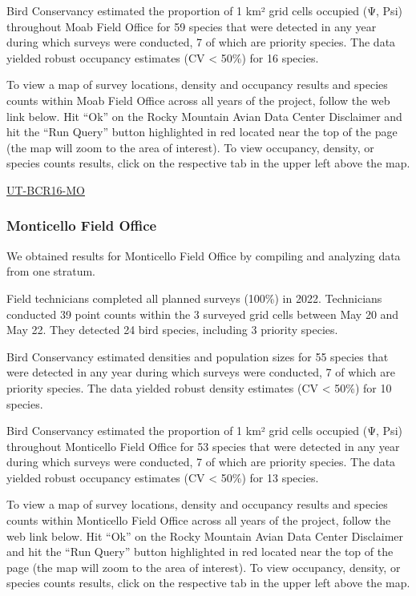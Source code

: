 \documentclass[
  letterpaper,
  DIV=11,
  numbers=noendperiod,
  oneside]{scrreprt}
\begin{document}
Bird Conservancy estimated the proportion of 1 km² grid cells occupied
(Ψ, Psi) throughout Moab Field Office for 59 species that were detected
in any year during which surveys were conducted, 7 of which are priority
species. The data yielded robust occupancy estimates (CV \textless{}
50\%) for 16 species.

To view a map of survey locations, density and occupancy results and
species counts within Moab Field Office across all years of the project,
follow the web link below. Hit ``Ok'' on the Rocky Mountain Avian Data
Center Disclaimer and hit the ``Run Query'' button highlighted in red
located near the top of the page (the map will zoom to the area of
interest). To view occupancy, density, or species counts results, click
on the respective tab in the upper left above the map.

\href{http://www.rmbo.org/new_site/adc/QueryWindow.aspx\#N4IgzgLgTghhCuBbEAuABCAqgFQLQCEBhAJQEYA2XAWQHl194oBTGeNAewDM0AZGAOwAmaKgJgBzJoib8IaXCPYwARmgBiASyYAbYTU6cNAYyYgAvkA=}{UT-BCR16-MO}

\hypertarget{monticello-field-office}{%
\subsubsection{Monticello Field Office}\label{monticello-field-office}}

We obtained results for Monticello Field Office by compiling and
analyzing data from one stratum.

Field technicians completed all planned surveys (100\%) in 2022.
Technicians conducted 39 point counts within the 3 surveyed grid cells
between May 20 and May 22. They detected 24 bird species, including 3
priority species.

Bird Conservancy estimated densities and population sizes for 55 species
that were detected in any year during which surveys were conducted, 7 of
which are priority species. The data yielded robust density estimates
(CV \textless{} 50\%) for 10 species.

Bird Conservancy estimated the proportion of 1 km² grid cells occupied
(Ψ, Psi) throughout Monticello Field Office for 53 species that were
detected in any year during which surveys were conducted, 7 of which are
priority species. The data yielded robust occupancy estimates (CV
\textless{} 50\%) for 13 species.

To view a map of survey locations, density and occupancy results and
species counts within Monticello Field Office across all years of the
project, follow the web link below. Hit ``Ok'' on the Rocky Mountain
Avian Data Center Disclaimer and hit the ``Run Query'' button
highlighted in red located near the top of the page (the map will zoom
to the area of interest). To view occupancy, density, or species counts
results, click on the respective tab in the upper left above the map.
\end{document}
